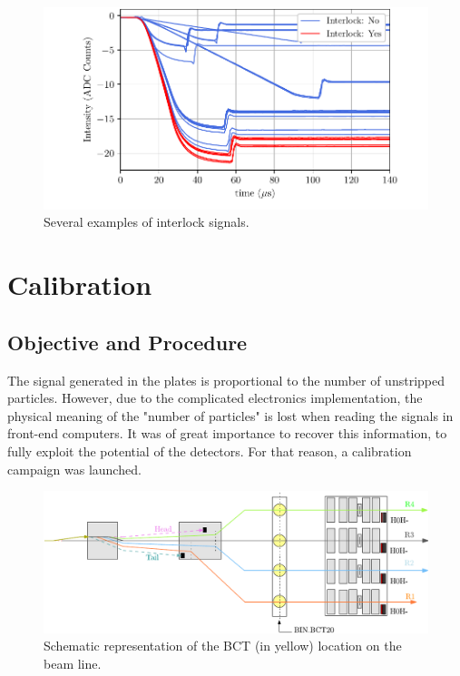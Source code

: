 \begin{figure}[h]
    \centering
    \includegraphics[width=\columnwidth]{Figure_InterlockSignal/InterlockSignal.pdf}
    \caption{Several examples of interlock signals.}
    \label{fig:InterlockSignal}
\end{figure}

\section{Calibration}
\label{sec:H0HmCalproc}

\subsection{Objective and Procedure}

The signal generated in the plates is proportional to the number of unstripped particles. However, due to the complicated electronics implementation, the physical meaning of the "number of particles" is lost when reading the signals in front-end computers. It was of great importance to recover this information, to fully exploit the potential of the detectors. For that reason, a calibration campaign was launched. 

\begin{figure}[h]
    \centering
    \includegraphics[width=1.0\columnwidth]{Figure_BCTPosition/BctPosSim.pdf}
    \caption{Schematic representation of the BCT (in yellow) location on the beam line. }
    \label{fig:LocationBCTPlate}
\end{figure}

